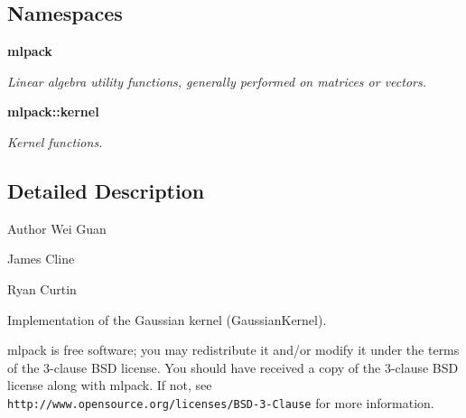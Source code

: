 \subsection*{Namespaces}
\begin{DoxyCompactItemize}
\item 
 {\bf mlpack}
\begin{DoxyCompactList}\small\item\em Linear algebra utility functions, generally performed on matrices or vectors. \end{DoxyCompactList}\item 
 {\bf mlpack\+::kernel}
\begin{DoxyCompactList}\small\item\em Kernel functions. \end{DoxyCompactList}\end{DoxyCompactItemize}


\subsection{Detailed Description}
\begin{DoxyAuthor}{Author}
Wei Guan 

James Cline 

Ryan Curtin
\end{DoxyAuthor}
Implementation of the Gaussian kernel (Gaussian\+Kernel).

mlpack is free software; you may redistribute it and/or modify it under the terms of the 3-\/clause B\+SD license. You should have received a copy of the 3-\/clause B\+SD license along with mlpack. If not, see {\tt http\+://www.\+opensource.\+org/licenses/\+B\+S\+D-\/3-\/\+Clause} for more information. 